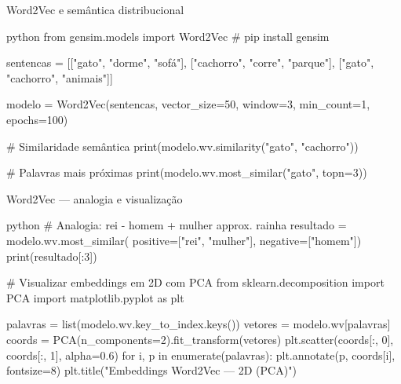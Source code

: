 \documentclass[xcolor=dvipsnames,t,aspectratio=169]{beamer}
\begin{document}
\begin{frame}[c, fragile]{Word2Vec e semântica distribucional}

\begin{code}{python}
from gensim.models import Word2Vec  # pip install gensim

sentencas = [["gato", "dorme", "sofá"],
             ["cachorro", "corre", "parque"],
             ["gato", "cachorro", "animais"]]

modelo = Word2Vec(sentencas, vector_size=50,
                  window=3, min_count=1, epochs=100)

# Similaridade semântica
print(modelo.wv.similarity("gato", "cachorro"))

# Palavras mais próximas
print(modelo.wv.most_similar("gato", topn=3))
\end{code}

\end{frame}

\begin{frame}[c, fragile]{Word2Vec — analogia e visualização}

\begin{code}{python}
# Analogia: rei - homem + mulher approx. rainha
resultado = modelo.wv.most_similar(
    positive=["rei", "mulher"], negative=["homem"])
print(resultado[:3])

# Visualizar embeddings em 2D com PCA
from sklearn.decomposition import PCA
import matplotlib.pyplot as plt

palavras = list(modelo.wv.key_to_index.keys())
vetores  = modelo.wv[palavras]
coords   = PCA(n_components=2).fit_transform(vetores)
plt.scatter(coords[:, 0], coords[:, 1], alpha=0.6)
for i, p in enumerate(palavras):
    plt.annotate(p, coords[i], fontsize=8)
plt.title("Embeddings Word2Vec — 2D (PCA)")
\end{code}

\end{frame}
\end{document}
